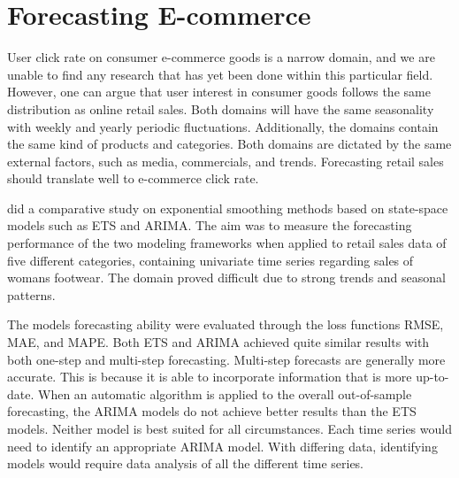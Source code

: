 \section{Forecasting E-commerce}
\label{section:RelatedWork:forecasting-ecommerce}

User click rate on consumer e-commerce goods is a narrow domain,
and we are unable to find any research that has yet been done within this particular field.
However, one can argue that user interest in consumer goods follows the same distribution
as online retail sales.
Both domains will have the same seasonality with weekly and yearly periodic fluctuations.
Additionally, the domains contain the same kind of products and categories.
Both domains are dictated by the same external factors, such as media, commercials, 
and trends.
Forecasting retail sales should translate well to e-commerce click rate.


\cite{Ramos2015} did a comparative study on exponential smoothing methods
based on state-space models such as ETS and ARIMA.
The aim was to measure the forecasting performance of the two modeling frameworks
when applied to retail sales data of five different categories,
containing univariate time series regarding sales of womans footwear.
The domain proved difficult due to strong trends and seasonal patterns.

The models forecasting ability were evaluated through the loss functions RMSE, MAE, and MAPE.
Both ETS and ARIMA achieved quite similar results with both one-step and multi-step forecasting.
Multi-step forecasts are generally more accurate.
This is because it is able to incorporate information that is more up-to-date.
When an automatic algorithm is applied to the overall out-of-sample forecasting,
the ARIMA models do not achieve better results than the ETS models.
Neither model is best suited for all circumstances.
Each time series would need to identify an appropriate ARIMA model.
With differing data, identifying models would require data analysis of all the different time series.




